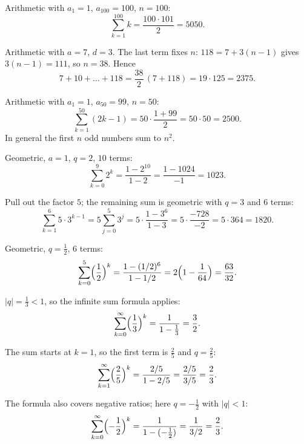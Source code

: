 \begin{solutions}
  \item Arithmetic with $a_1=1$, $a_{100}=100$, $n=100$:
        \[
          \sum_{k=1}^{100} k=\frac{100\cdot 101}{2}=5050 .
        \]

  \item Arithmetic with $a=7$, $d=3$. The last term fixes $n$:
        $118=7+3(n-1)$ gives $3(n-1)=111$, so $n=38$. Hence
        \[
          7+10+\dots+118=\frac{38}{2}\,(7+118)=19\cdot 125=2375 .
        \]

  \item Arithmetic with $a_1=1$, $a_{50}=99$, $n=50$:
        \[
          \sum_{k=1}^{50}(2k-1)=50\cdot\frac{1+99}{2}=50\cdot 50=2500 .
        \]
        In general the first $n$ odd numbers sum to $n^{2}$.

  \item Geometric, $a=1$, $q=2$, $10$ terms:
        \[
          \sum_{k=0}^{9}2^{k}=\frac{1-2^{10}}{1-2}=\frac{1-1024}{-1}=1023 .
        \]

  \item Pull out the factor $5$; the remaining sum is geometric with $q=3$
        and $6$ terms:
        \[
          \sum_{k=1}^{6}5\cdot 3^{k-1}
          =5\sum_{j=0}^{5}3^{j}
          =5\cdot\frac{1-3^{6}}{1-3}
          =5\cdot\frac{-728}{-2}=5\cdot 364=1820 .
        \]

  \item Geometric, $q=\tfrac12$, $6$ terms:
        \[
          \sum_{k=0}^{5}\Bigl(\frac12\Bigr)^{k}
          =\frac{1-(1/2)^{6}}{1-1/2}
          =2\Bigl(1-\frac{1}{64}\Bigr)=\frac{63}{32} .
        \]

  \item $|q|=\tfrac13<1$, so the infinite sum formula applies:
        \[
          \sum_{k=0}^{\infty}\Bigl(\frac13\Bigr)^{k}
          =\frac{1}{1-\tfrac13}=\frac{3}{2} .
        \]

  \item The sum starts at $k=1$, so the first term is $\tfrac25$ and
        $q=\tfrac25$:
        \[
          \sum_{k=1}^{\infty}\Bigl(\frac25\Bigr)^{k}
          =\frac{2/5}{1-2/5}=\frac{2/5}{3/5}=\frac{2}{3} .
        \]

  \item The formula also covers negative ratios; here $q=-\tfrac12$ with
        $|q|<1$:
        \[
          \sum_{k=0}^{\infty}\Bigl(-\frac12\Bigr)^{k}
          =\frac{1}{1-(-\tfrac12)}=\frac{1}{3/2}=\frac{2}{3} .
        \]


\end{solutions}
